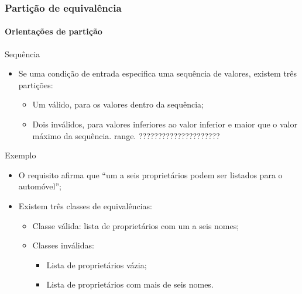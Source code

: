 \begin{frame}
\frametitle{Partição de equivalência}
\framesubtitle{Orientações de partição}

\begin{block:fact}{Sequência}
\begin{itemize}
	\item Se uma condição de entrada especifica uma sequência de valores,
	existem três partições:
	\begin{itemize}
		\item Um válido, para os valores dentro da sequência;

		\item Dois inválidos, para valores inferiores ao valor inferior e maior
		que o valor máximo da sequência.
		range. ?????????????????????
	\end{itemize}
\end{itemize}
\end{block:fact}


\begin{block}{Exemplo}
\begin{itemize}
	\item O requisito afirma que ``um a seis proprietários podem ser listados
	para o automóvel'';

	\item Existem três classes de equivalências:
	\begin{itemize}
		\item Classe válida: lista de proprietários com um a seis nomes;
		\item Classes inválidas:
		\begin{itemize}
			\item Lista de proprietários vázia;
			\item Lista de proprietários com mais de seis nomes.
		\end{itemize}
	\end{itemize}
\end{itemize}
\end{block}
\end{frame}




